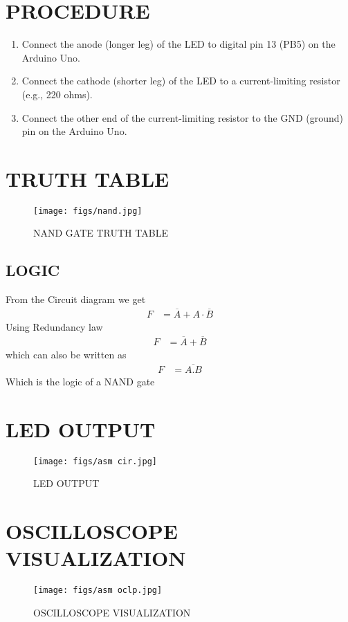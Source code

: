 \documentclass[journal,12pt,twocolumn]{IEEEtran}
\begin{document}
\section{PROCEDURE}
\begin{enumerate}
\item Connect the anode (longer leg) of the LED to digital pin 13 (PB5) on the Arduino Uno.
\item Connect the cathode (shorter leg) of the LED to a current-limiting resistor (e.g., 220 ohms).
\item Connect the other end of the current-limiting resistor to the GND (ground) pin on the Arduino Uno.
\end{enumerate}
\section{TRUTH TABLE}
\begin{figure}[H]
\centering
\texttt{[image: figs/nand.jpg]}
\caption{NAND GATE TRUTH TABLE}
\label{fig:nand.jpg}
\end{figure}
\subsection{LOGIC}
From the Circuit diagram we get
\begin{align}
	F&=\overline{A}+A\cdot\overline{B} 
\end{align}
Using Redundancy law
\begin{align}
	F&=\overline{A}+\overline{B}
\end{align}
which can also be written as
\begin{align}
    F&=\overline{A.B}
\end{align}
Which is the logic of a NAND gate
\section{LED OUTPUT}
\begin{figure}[H]
\centering
\texttt{[image: figs/asm cir.jpg]}
\caption{LED OUTPUT}
\label{fig:asm cir.jpg}
\end{figure}

\section{OSCILLOSCOPE VISUALIZATION}
\begin{figure}[H]
\centering
\texttt{[image: figs/asm oclp.jpg]}
\caption{OSCILLOSCOPE VISUALIZATION}
\label{fig:asm osclp.jpg}
\end{figure}
\end{document}
